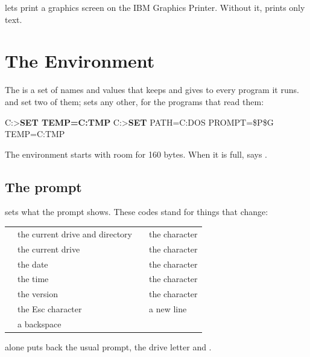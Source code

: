 lets  print a graphics screen on the
IBM Graphics Printer. Without it,  prints only text.

\section{The Environment}

The  is a set of names and values that
 keeps and gives to every program it runs. 
and  set two of them;  sets any other, for the
programs that read them:

\begin{dialogue}
C:\bs>\textbf{SET TEMP=C:\bs{}TMP}
C:\bs>\textbf{SET}
PATH=C:\bs{}DOS
PROMPT=\$P\$G
TEMP=C:\bs{}TMP
\end{dialogue}

The environment starts with room for 160 bytes. When it is full,
 says .

\subsection{The prompt}  sets what the prompt shows. These
codes stand for things that change:

\begin{tabularx}{\textwidth}{@{}P{0.6in}X@{}P{0.6in}X@{}}
\toprule
{} & the current drive and directory &  & the character \typed{>}\\
 & the current drive &  & the character \typed{<}\\
 & the date &  & the character \typed{|}\\
 & the time &  & the character \typed{=}\\
 & the version & \typed{\$\$} & the character \typed{\$}\\
 & the Esc character & \typed{\$\_} & a new line\\
 & a backspace & & \\
\bottomrule
\end{tabularx}

 alone puts back the usual prompt, the drive letter and
\typed{>}.
